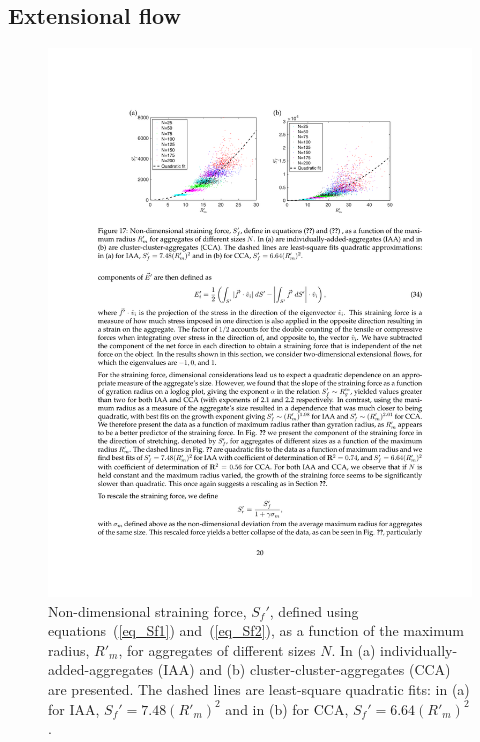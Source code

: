 \subsection{Extensional flow}


\begin{figure}[ht]
	\begin{center}
		 \includegraphics[scale = 1.0]{./figures/fig_strain_allprime.pdf}
	\end{center}
	\caption{Non-dimensional straining force, $S_f'$, defined using equations~(\ref{eq_Sf1}) and~(\ref{eq_Sf2}), as a function of the maximum radius, $R'_m$, for aggregates of different sizes $N$. In (a) individually-added-aggregates (IAA) and (b) cluster-cluster-aggregates (CCA) are presented. The dashed lines are least-square quadratic fits: in (a) for IAA, $S_f' =7.48 (R'_m)^2 $ and in (b) for CCA, $S_f'  = 6.64 (R'_m)^2$.}
	\label{fig_strain_maxR}
\end{figure}

